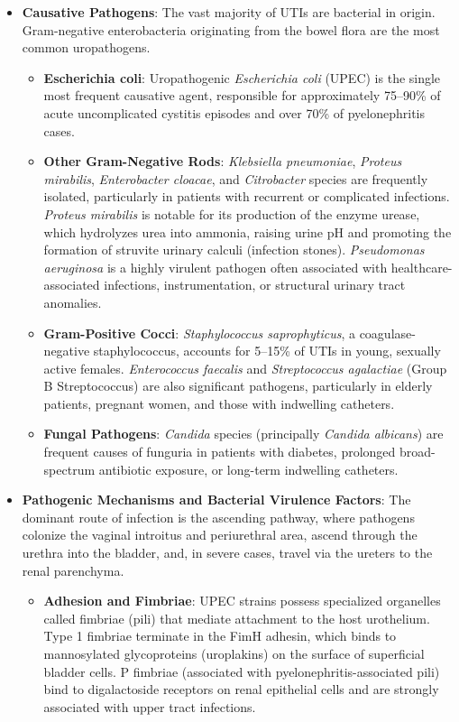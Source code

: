 \begin{itemize}
    \item \textbf{Causative Pathogens}: The vast majority of UTIs are bacterial in origin. Gram-negative enterobacteria originating from the bowel flora are the most common uropathogens.
    \begin{itemize}
        \item \textbf{Escherichia coli}: Uropathogenic \textit{Escherichia coli} (UPEC) is the single most frequent causative agent, responsible for approximately 75--90\% of acute uncomplicated cystitis episodes and over 70\% of pyelonephritis cases.
        \item \textbf{Other Gram-Negative Rods}: \textit{Klebsiella pneumoniae}, \textit{Proteus mirabilis}, \textit{Enterobacter cloacae}, and \textit{Citrobacter} species are frequently isolated, particularly in patients with recurrent or complicated infections. \textit{Proteus mirabilis} is notable for its production of the enzyme urease, which hydrolyzes urea into ammonia, raising urine pH and promoting the formation of struvite urinary calculi (infection stones). \textit{Pseudomonas aeruginosa} is a highly virulent pathogen often associated with healthcare-associated infections, instrumentation, or structural urinary tract anomalies.
        \item \textbf{Gram-Positive Cocci}: \textit{Staphylococcus saprophyticus}, a coagulase-negative staphylococcus, accounts for 5--15\% of UTIs in young, sexually active females. \textit{Enterococcus faecalis} and \textit{Streptococcus agalactiae} (Group B Streptococcus) are also significant pathogens, particularly in elderly patients, pregnant women, and those with indwelling catheters.
        \item \textbf{Fungal Pathogens}: \textit{Candida} species (principally \textit{Candida albicans}) are frequent causes of funguria in patients with diabetes, prolonged broad-spectrum antibiotic exposure, or long-term indwelling catheters.
    \end{itemize}
    \item \textbf{Pathogenic Mechanisms and Bacterial Virulence Factors}: The dominant route of infection is the ascending pathway, where pathogens colonize the vaginal introitus and periurethral area, ascend through the urethra into the bladder, and, in severe cases, travel via the ureters to the renal parenchyma.
    \begin{itemize}
        \item \textbf{Adhesion and Fimbriae}: UPEC strains possess specialized organelles called fimbriae (pili) that mediate attachment to the host urothelium. Type 1 fimbriae terminate in the FimH adhesin, which binds to mannosylated glycoproteins (uroplakins) on the surface of superficial bladder cells. P fimbriae (associated with pyelonephritis-associated pili) bind to digalactoside receptors on renal epithelial cells and are strongly associated with upper tract infections.

\end{itemize}
\end{itemize}
